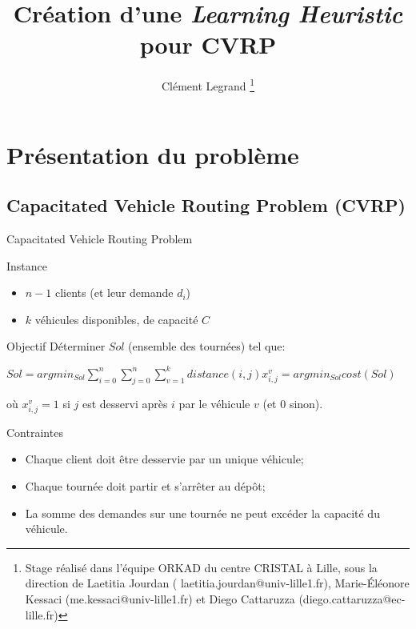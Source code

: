 \documentclass{beamer}
\title{Création d'une \emph{Learning Heuristic} pour CVRP}
\author{Clément Legrand \footnote{Stage réalisé dans l'équipe ORKAD du centre CRISTAL à Lille, sous la direction de Laetitia Jourdan ( laetitia.jourdan@univ-lille1.fr), Marie-Éléonore Kessaci (me.kessaci@univ-lille1.fr) et Diego Cattaruzza (diego.cattaruzza@ec-lille.fr)}}
\begin{document}
\begin{frame}[plain]
\titlepage
\end{frame}

\section{Présentation du problème}

\subsection{Capacitated Vehicle Routing Problem (CVRP)}
\footnotesize
\begin{frame}{Capacitated Vehicle Routing Problem}
\begin{block}{Instance}
\begin{itemize}
\item $n-1$ clients (et leur demande $d_i$)
\item $k$ véhicules disponibles, de capacité $C$ 
\end{itemize}
\end{block}

\begin{exampleblock}{Objectif}
Déterminer $Sol$ (ensemble des tournées) tel que:

\centering
$ Sol = argmin_{Sol} \sum_{i = 0}^{n} \sum_{j = 0}^{n} \sum_{v = 1}^{k} distance(i,j) x_{i,j}^v = argmin_{Sol}cost(Sol)$

où $x_{i,j}^v = 1$ si $j$ est desservi après $i$ par le véhicule $v$ (et 0 sinon). 



\begin{alertblock}{Contraintes}
\begin{itemize}
\item Chaque client doit être desservie par un unique véhicule;
\item Chaque tournée doit partir et s'arrêter au dépôt;
\item La somme des demandes sur une tournée ne peut excéder la capacité du véhicule.
\end{itemize}
\end{alertblock}


\end{exampleblock}
\end{frame}
\end{document}
